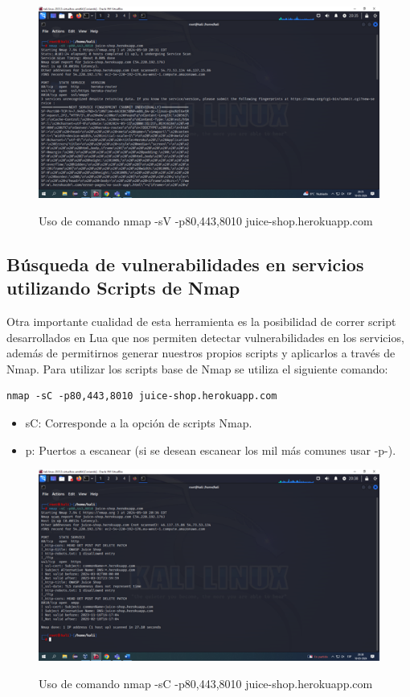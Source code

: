 \documentclass[stu, 11pt, letterpaper, donotrepeattitle, floatsintext, natbib]{apa7}
\begin{document}
\begin{figure}[H]
    \centering
    \caption{Uso de comando nmap -sV -p80,443,8010 juice-shop.herokuapp.com}
    \includegraphics[width=0.75\linewidth]{Imagen2.png} %
    \label{fig:OverallEffect}
\end{figure}

\subsection{Búsqueda de vulnerabilidades en servicios utilizando Scripts de Nmap} 
Otra importante cualidad de esta herramienta es la posibilidad de correr script desarrollados en Lua que nos permiten detectar vulnerabilidades en los servicios, además de permitirnos generar nuestros propios scripts y aplicarlos a través de Nmap. Para utilizar los scripts base de Nmap se utiliza el siguiente comando:
\newline

\begin{lstlisting}
nmap -sC -p80,443,8010 juice-shop.herokuapp.com
\end{lstlisting}

\begin{itemize}
  \item sC: Corresponde a la opción de scripts Nmap.
  \item p: Puertos a escanear (si se desean escanear los mil más comunes usar -p-).
\end{itemize}

\begin{figure}[H]
    \centering
    \caption{Uso de comando nmap -sC -p80,443,8010 juice-shop.herokuapp.com}
    \includegraphics[width=0.75\linewidth]{Imagen3.png} %
    \label{fig:OverallEffect}
\end{figure}
\end{document}
